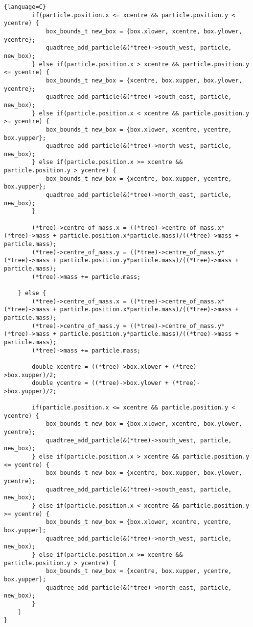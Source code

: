 \begin{lstlisting}{language=C}
        if(particle.position.x <= xcentre && particle.position.y < ycentre) {
            box_bounds_t new_box = {box.xlower, xcentre, box.ylower, ycentre};
            quadtree_add_particle(&(*tree)->south_west, particle, new_box);
        } else if(particle.position.x > xcentre && particle.position.y <= ycentre) {
            box_bounds_t new_box = {xcentre, box.xupper, box.ylower, ycentre};
            quadtree_add_particle(&(*tree)->south_east, particle, new_box);
        } else if(particle.position.x < xcentre && particle.position.y >= ycentre) {
            box_bounds_t new_box = {box.xlower, xcentre, ycentre, box.yupper};
            quadtree_add_particle(&(*tree)->north_west, particle, new_box);
        } else if(particle.position.x >= xcentre && particle.position.y > ycentre) {
            box_bounds_t new_box = {xcentre, box.xupper, ycentre, box.yupper};
            quadtree_add_particle(&(*tree)->north_east, particle, new_box);
        }

        (*tree)->centre_of_mass.x = ((*tree)->centre_of_mass.x*(*tree)->mass + particle.position.x*particle.mass)/((*tree)->mass + particle.mass);
        (*tree)->centre_of_mass.y = ((*tree)->centre_of_mass.y*(*tree)->mass + particle.position.y*particle.mass)/((*tree)->mass + particle.mass);
        (*tree)->mass += particle.mass;

    } else {
        (*tree)->centre_of_mass.x = ((*tree)->centre_of_mass.x*(*tree)->mass + particle.position.x*particle.mass)/((*tree)->mass + particle.mass);
        (*tree)->centre_of_mass.y = ((*tree)->centre_of_mass.y*(*tree)->mass + particle.position.y*particle.mass)/((*tree)->mass + particle.mass);
        (*tree)->mass += particle.mass;

        double xcentre = ((*tree)->box.xlower + (*tree)->box.xupper)/2;
        double ycentre = ((*tree)->box.ylower + (*tree)->box.yupper)/2;

        if(particle.position.x <= xcentre && particle.position.y < ycentre) {
            box_bounds_t new_box = {box.xlower, xcentre, box.ylower, ycentre};
            quadtree_add_particle(&(*tree)->south_west, particle, new_box);
        } else if(particle.position.x > xcentre && particle.position.y <= ycentre) {
            box_bounds_t new_box = {xcentre, box.xupper, box.ylower, ycentre};
            quadtree_add_particle(&(*tree)->south_east, particle, new_box);
        } else if(particle.position.x < xcentre && particle.position.y >= ycentre) {
            box_bounds_t new_box = {box.xlower, xcentre, ycentre, box.yupper};
            quadtree_add_particle(&(*tree)->north_west, particle, new_box);
        } else if(particle.position.x >= xcentre && particle.position.y > ycentre) {
            box_bounds_t new_box = {xcentre, box.xupper, ycentre, box.yupper};
            quadtree_add_particle(&(*tree)->north_east, particle, new_box);
        }
    }
}
\end{lstlisting}

